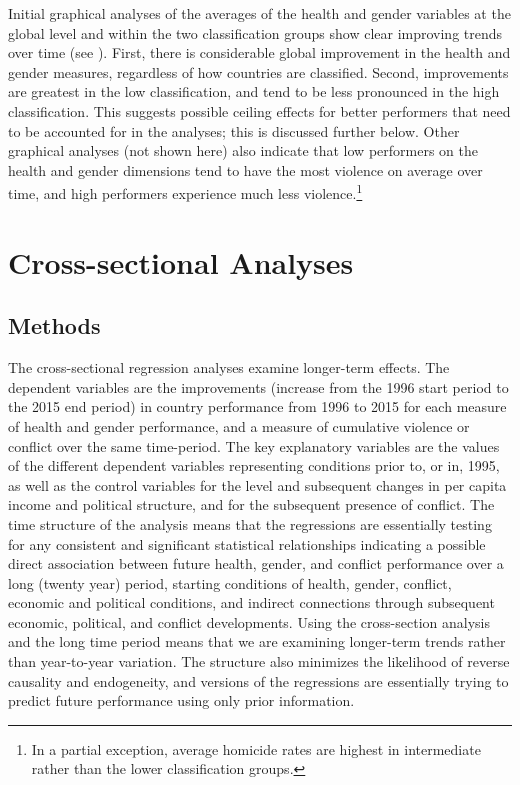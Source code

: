\documentclass[12pt]{article}
\begin{document}
Initial graphical analyses of the averages of the health and gender variables at the global level and within the two classification groups show clear improving trends over time (see ).
First, there is considerable global improvement in the health and gender measures, regardless of how countries are classified.
Second, improvements are greatest in the low classification, and tend to be less pronounced in the high classification.
This suggests possible ceiling effects for better performers that need to be accounted for in the analyses; this is discussed further below.
Other graphical analyses (not shown here) also indicate that low performers on the health and gender dimensions tend to have the most violence on average over time, and high performers experience much less violence.\footnote{In a partial exception, average homicide rates are highest in intermediate rather than the lower classification groups.}

\section{Cross-sectional Analyses}

\subsection{Methods}


The cross-sectional regression analyses examine longer-term effects.
The dependent variables are the improvements (increase from the 1996 start period to the 2015 end period) in country performance from 1996 to 2015 for each measure of health and gender performance, and a measure of cumulative violence or conflict over the same time-period.
The key explanatory variables are the values of the different dependent variables representing conditions prior to, or in, 1995, as well as the control variables for the level and subsequent changes in per capita income and political structure, and for the subsequent presence of conflict. The time structure of the analysis means that the regressions are essentially testing for any consistent and significant statistical relationships indicating a possible direct association between future health, gender, and conflict performance over a long (twenty year) period, starting conditions of health, gender, conflict, economic and political conditions, and indirect connections through subsequent economic, political, and conflict developments. Using the cross-section analysis and the long time period means that we are examining longer-term trends rather than year-to-year variation. The structure also minimizes the likelihood of reverse causality and endogeneity, and versions of the regressions are essentially trying to predict future performance using only prior information.
\end{document}
